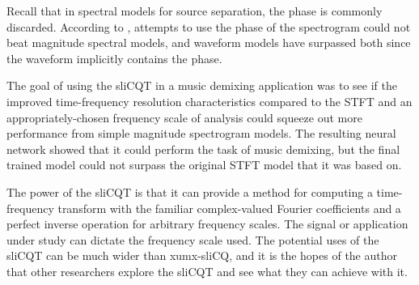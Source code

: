 \documentclass[report.tex]{subfiles}
\begin{document}
Recall that in spectral models for source separation, the phase is commonly discarded. According to \textcite{endtoend}, attempts to use the phase of the spectrogram could not beat magnitude spectral models, and waveform models have surpassed both since the waveform implicitly contains the phase.

The goal of using the sliCQT in a music demixing application was to see if the improved time-frequency resolution characteristics compared to the STFT and an appropriately-chosen frequency scale of analysis could squeeze out more performance from simple magnitude spectrogram models. The resulting neural network showed that it could perform the task of music demixing, but the final trained model could not surpass the original STFT model that it was based on.

The power of the sliCQT is that it can provide a method for computing a time-frequency transform with the familiar complex-valued Fourier coefficients and a perfect inverse operation for arbitrary frequency scales. The signal or application under study can dictate the frequency scale used. The potential uses of the sliCQT can be much wider than xumx-sliCQ, and it is the hopes of the author that other researchers explore the sliCQT and see what they can achieve with it.
\end{document}
